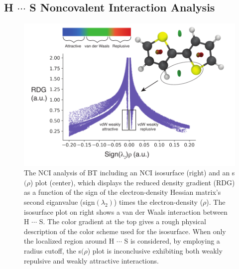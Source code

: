 \subsection{\texorpdfstring{H $\cdots$ S}{HSN} Noncovalent Interaction Analysis}
\begin{figure}[hbt!]
    \centering
    \includegraphics{figures/append_aroma/pt_nci_copy.pdf}
    \caption[\texorpdfstring{H $\cdots$ S}{HSN} NCI Analysis]{The NCI analysis of BT including an NCI isosurface (right) and an s$(\rho$) plot (center), which displays the reduced density gradient (RDG) as a function of the sign of the electron-density Hessian matrix's second eiganvalue (sign$(\lambda_{2})$) times the electron-density ($\rho$). The isosurface plot on right shows a van der Waals interaction between H $\cdots$ S. The color gradient at the top gives a rough physical description of the color scheme used for the isosurface. When only the localized region around H $\cdots$ S is considered, by employing a radius cutoff, the s$(\rho$) plot is inconclusive exhibiting both weakly repulsive and weakly attractive interactions.}
    \label{fig:pt_nci}
\end{figure}
\clearpage

